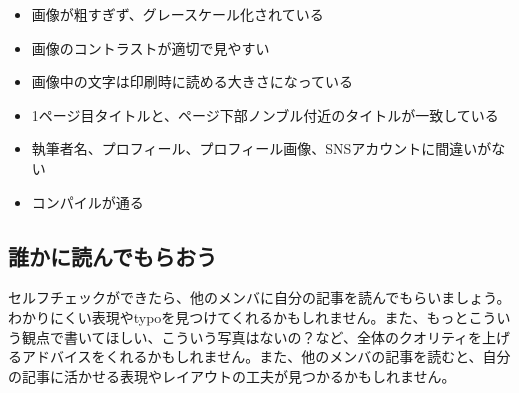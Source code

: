 \begin{itemize}
\item 画像が粗すぎず、グレースケール化されている
\item 画像のコントラストが適切で見やすい
\item 画像中の文字は印刷時に読める大きさになっている
\item 1ページ目タイトルと、ページ下部ノンブル付近のタイトルが一致している
\item 執筆者名、プロフィール、プロフィール画像、SNSアカウントに間違いがない
\item コンパイルが通る
\end{itemize}

\subsection{誰かに読んでもらおう}
セルフチェックができたら、他のメンバに自分の記事を読んでもらいましょう。わかりにくい表現やtypoを見つけてくれるかもしれません。また、もっとこういう観点で書いてほしい、こういう写真はないの？など、全体のクオリティを上げるアドバイスをくれるかもしれません。また、他のメンバの記事を読むと、自分の記事に活かせる表現やレイアウトの工夫が見つかるかもしれません。

\footnotesize



